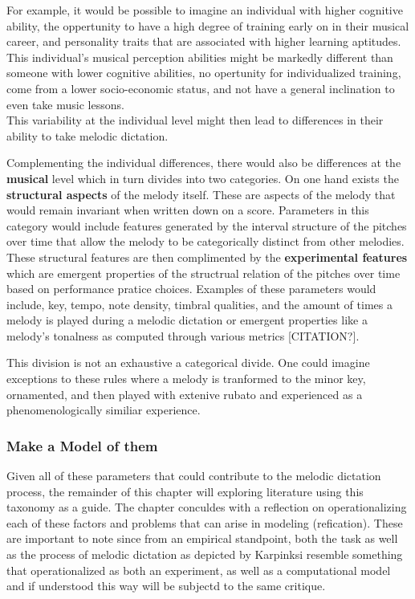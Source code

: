 \documentclass[]{book}
\theoremstyle{definition}
\theoremstyle{definition}
\theoremstyle{definition}
\theoremstyle{remark}
\begin{document}
For example, it would be possible to imagine an individual with higher
cognitive ability, the oppertunity to have a high degree of training
early on in their musical career, and personality traits that are
associated with higher learning aptitudes. This individual's musical
perception abilities might be markedly different than someone with lower
cognitive abilities, no opertunity for individualized training, come
from a lower socio-economic status, and not have a general inclination
to even take music lessons.\\
This variability at the individual level might then lead to differences
in their ability to take melodic dictation.

Complementing the individual differences, there would also be
differences at the \textbf{musical} level which in turn divides into two
categories. On one hand exists the \textbf{structural aspects} of the
melody itself. These are aspects of the melody that would remain
invariant when written down on a score. Parameters in this category
would include features generated by the interval structure of the
pitches over time that allow the melody to be categorically distinct
from other melodies. These structural features are then complimented by
the \textbf{experimental features} which are emergent properties of the
structrual relation of the pitches over time based on performance
pratice choices. Examples of these parameters would include, key, tempo,
note density, timbral qualities, and the amount of times a melody is
played during a melodic dictation or emergent properties like a melody's
tonalness as computed through various metrics {[}CITATION?{]}.

This division is not an exhaustive a categorical divide. One could
imagine exceptions to these rules where a melody is tranformed to the
minor key, ornamented, and then played with extenive rubato and
experienced as a phenomenologically similiar experience.

\hypertarget{make-a-model-of-them}{%
\subsubsection{Make a Model of them}\label{make-a-model-of-them}}

Given all of these parameters that could contribute to the melodic
dictation process, the remainder of this chapter will exploring
literature using this taxonomy as a guide. The chapter conculdes with a
reflection on operationalizing each of these factors and problems that
can arise in modeling (refication). These are important to note since
from an empirical standpoint, both the task as well as the process of
melodic dictation as depicted by Karpinksi resemble something that
operationalized as both an experiment, as well as a computational model
and if understood this way will be subjectd to the same critique.
\end{document}
